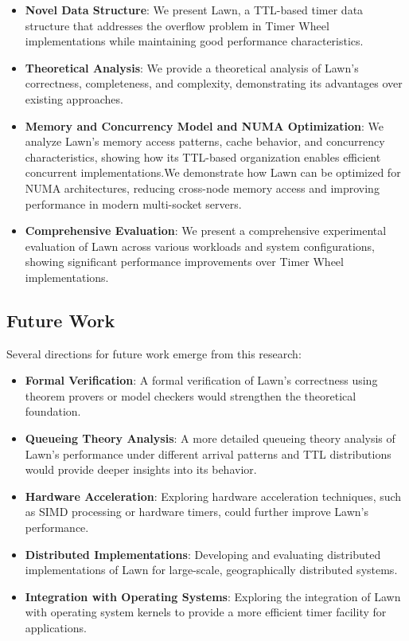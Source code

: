 \documentclass[conference]{IEEEtran}
\begin{document}
\begin{itemize}
    \item \textbf{Novel Data Structure}: We present Lawn, a TTL-based timer data structure that addresses the overflow problem in Timer Wheel implementations while maintaining good performance characteristics.
    
    \item \textbf{Theoretical Analysis}: We provide a theoretical analysis of Lawn's correctness, completeness, and complexity, demonstrating its advantages over existing approaches.
    
    \item \textbf{Memory and Concurrency Model and NUMA Optimization}: We analyze Lawn's memory access patterns, cache behavior, and concurrency characteristics, showing how its TTL-based organization enables efficient concurrent implementations.We demonstrate how Lawn can be optimized for NUMA architectures, reducing cross-node memory access and improving performance in modern multi-socket servers.
    
    \item \textbf{Comprehensive Evaluation}: We present a comprehensive experimental evaluation of Lawn across various workloads and system configurations, showing significant performance improvements over Timer Wheel implementations.
\end{itemize}

\subsection{Future Work}
Several directions for future work emerge from this research:

\begin{itemize}
    \item \textbf{Formal Verification}: A formal verification of Lawn's correctness using theorem provers or model checkers would strengthen the theoretical foundation.
    
    \item \textbf{Queueing Theory Analysis}: A more detailed queueing theory analysis of Lawn's performance under different arrival patterns and TTL distributions would provide deeper insights into its behavior.
    
    \item \textbf{Hardware Acceleration}: Exploring hardware acceleration techniques, such as SIMD processing or hardware timers, could further improve Lawn's performance.
    
    \item \textbf{Distributed Implementations}: Developing and evaluating distributed implementations of Lawn for large-scale, geographically distributed systems.
    
    \item \textbf{Integration with Operating Systems}: Exploring the integration of Lawn with operating system kernels to provide a more efficient timer facility for applications.
\end{itemize}
\end{document}
